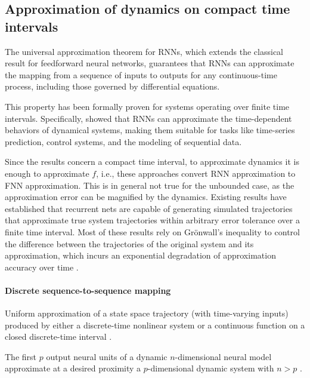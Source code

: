 \documentclass{article}
\theoremstyle{definition}
\theoremstyle{remark}
\begin{document}
	


\subsection{Approximation of dynamics on compact time intervals}
The universal approximation theorem for RNNs, which extends the classical result for feedforward neural networks, guarantees that RNNs can approximate the mapping from a sequence of inputs to outputs for any continuous-time process, including those governed by differential equations.


This property has been formally proven for systems operating over finite time intervals. Specifically, \citet{funahashi1993approximation} showed that RNNs can approximate the time-dependent behaviors of dynamical systems, making them suitable for tasks like time-series prediction, control systems, and the modeling of sequential data.

Since the results concern a compact time interval, to approximate dynamics it is enough to approximate $f$, i.e., these approaches convert RNN approximation to FNN approximation.
This is in general not true for the unbounded case, as the approximation error can be magnified by the dynamics.
Existing results have established that recurrent nets are capable of generating simulated trajectories that approximate true system trajectories within arbitrary error tolerance over a finite time interval.
Most of these results rely on Gr\"{o}nwall’s inequality to control the difference between the trajectories of the original system and its approximation, which incurs an exponential degradation of approximation accuracy over time
\citep{sontag1992neural, sontag1998learning, funahashi1993approximation,chow2000modeling, li2005approximation}.

\paragraph{Discrete sequence-to-sequence mapping}
Uniform approximation of a state space trajectory (with time-varying inputs) produced by either a discrete-time nonlinear system or a continuous function on a closed discrete-time interval \citep{jin1995universal}.

The first $p$ output neural units of a dynamic $n$-dimensional neural model approximate at a desired proximity a $p$-dimensional dynamic system with $n > p$ \citep{kambhampati2000approximation}.
\end{document}
